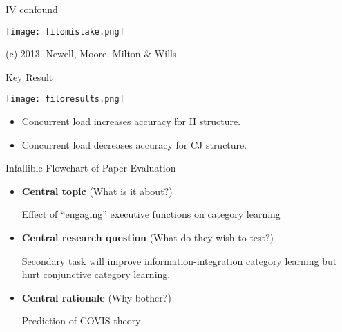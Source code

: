 \documentclass{beamer}
\begin{document}
\begin{frame}{IV confound}

\centerline{\texttt{[image: filomistake.png]}}

\tiny(c) 2013. Newell, Moore, Milton \& Wills

\end{frame}

\begin{frame}{Key Result}

\centerline{\texttt{[image: filoresults.png]}}

\begin{itemize}
\item Concurrent load increases accuracy for II structure.
\item Concurrent load decreases accuracy for CJ structure.  

\end{itemize}

\end{frame}

\begin{frame}{Infallible Flowchart of Paper Evaluation}
\begin{itemize}
\item \textbf{Central topic} (What is it about?)
	
  Effect of ``engaging'' executive functions on category learning
\item \textbf{Central research question} (What do they wish to test?)
	
  Secondary task will improve information-integration category
  learning but hurt conjunctive category learning.
\item \textbf{Central rationale} (Why bother?)
	 
	 Prediction of COVIS theory
\end{itemize}
\end{frame}
\end{document}
